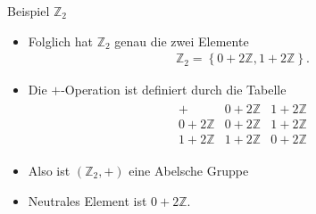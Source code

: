 \documentclass{beamer}
\newcommand\ZZ{\mathbb Z}
\newcommand\cbc[1]{\left\{{#1}\right\}}
\begin{document}
\begin{frame}
\begin{overprint}
		\begin{block}{Beispiel $\ZZ_2$}
			\begin{itemize}
				\item Folglich hat $\ZZ_2$ genau die zwei Elemente
					\begin{align*}
						\ZZ_2=\cbc{0+2\ZZ,1+2\ZZ}.
					\end{align*}
				\item Die $+$-Operation ist definiert durch die Tabelle
					\begin{align*}
						\begin{array}{c|c|c}
							+&0+2\ZZ&1+2\ZZ\\\hline
							0+2\ZZ&0+2\ZZ&1+2\ZZ\\\hline
							1+2\ZZ&1+2\ZZ&0+2\ZZ
						\end{array}	
					\end{align*}
				\item Also ist $(\ZZ_2,+)$ eine Abelsche Gruppe
				\item Neutrales Element ist $0+2\ZZ$.
			\end{itemize}
		\end{block}
	\end{overprint}
\end{frame}
\end{document}
